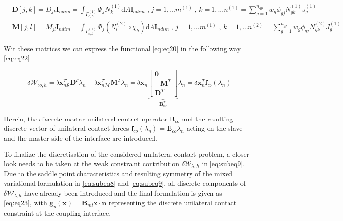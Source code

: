 \documentclass[a4paper,10pt]{article} %
\begin{document}
\begin{subequations}\label{eq:eq21}
    \begin{align}
        & \mathbf{D}[j,k] = D_{jk} \mathbf{I}_{ndim} = \int_{\Gamma_{c,h}^{(1)}} \Phi_j N_k^{(1)}\text{d}A\mathbf{I}_{ndim}\text{ , } j=1,...m^{(1)}\text{ , } k= 1, ...n^{(1)} = \sum_{g = 1}^{n_{gp}} w_g \phi_{gj} N_{gk}^{(1)} J_g^{(1)} \\
        & \mathbf{M}[j,l] = M_{jl} \mathbf{I}_{ndim} = \int_{\Gamma_{c,h}^{(1)}} \Phi_j \left(N_l^{(2)} \circ \chi_h \right)\text{d}A\mathbf{I}_{ndim}\text{ , } j=1,...m^{(1)}\text{ , } k= 1, ...n^{(2)} = \sum_{g = 1}^{n_{gp}} w_g \phi_{gj} N_{gk}^{(2)} J_g^{(1)} 
    \end{align}
\end{subequations}

Wit these matrices we can express the functional \eqref{eq:eq20} in the following way \eqref{eq:eq22}.

\begin{equation}\label{eq:eq22}
    -\delta \mathcal{W}_{co,h} = \delta \mathbf{x}_{n\mathcal{S}}^T\mathbf{D}^T\lambda_n - \delta \mathbf{x}_{n\mathcal{M}}^T\mathbf{M}^T\lambda_n = \delta \mathbf{x}_n \underbrace{\left[\begin{array}{c} \mathbf{0} \\ -\mathbf{M}^T \\ \mathbf{D}^T\end{array} \right]}_{\mathbf{B}^T_{co}} \lambda_n = \delta \mathbf{x}_n^T \mathbf{f}_{co}(\lambda_n)
\end{equation}

Herein, the discrete mortar unilateral contact operator $\mathbf{B}_{co}$ and the resulting discrete vector of unilateral contact forces $\mathbf{f}_{co} (\lambda_n) = \mathbf{B}_{co}\lambda_n$ acting on the slave and the master side of the interface are introduced. 

To finalize the discretisation of the considered unilateral contact problem, a closer look needs to
be taken at the weak constraint contribution $\delta \mathcal{W}_{\lambda,h} $ in \eqref{eq:subeq9}. Due to the saddle point characteristics and resulting symmetry of the mixed variational formulation in \eqref{eq:subeq8}  and \eqref{eq:subeq9}, all discrete components of $\delta \mathcal{W}_{\lambda,h}$ have already been introduced and the final formulation is given as \eqref{eq:eq23}, with $\mathbf{g}_{n}(\mathbf{x}) = \mathbf{B}_{mt} \mathbf{x} \cdot \mathbf{n}$ representing the discrete unilateral contact constraint at the coupling interface.
\end{document}
